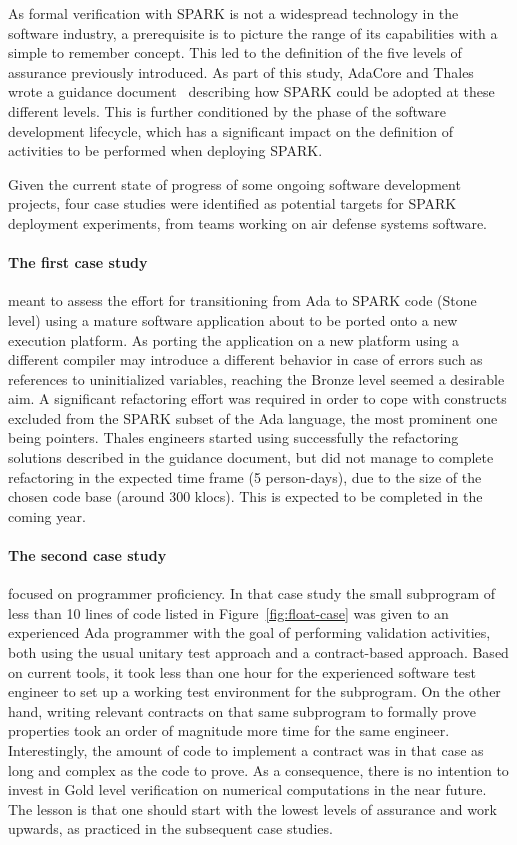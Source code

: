 \documentclass{eceasst}
\begin{document}
As formal verification with SPARK is not a widespread technology in the
software industry, a prerequisite is to picture the range of its capabilities
with a simple to remember concept. This led to the definition of the five
levels of assurance previously introduced. As part of this study, AdaCore and
Thales wrote a guidance document~\cite{AdaCoreThalesSPARK} describing how SPARK
could be adopted at these different levels. This is further conditioned by the
phase of the software development lifecycle, which has a significant impact on
the definition of activities to be performed when deploying SPARK.

Given the current state of progress of some ongoing software development
projects, four case studies were identified as potential targets for SPARK
deployment experiments, from teams working on air defense systems software.

\paragraph{The first case study} meant to assess the effort for transitioning from Ada to
SPARK code (Stone level) using a mature software application about to be ported
onto a new execution platform. As porting the application on a new platform
using a different compiler may introduce a different behavior in case of errors
such as references to uninitialized variables, reaching the Bronze level seemed
a desirable aim. A significant refactoring effort was required in order to cope
with constructs excluded from the SPARK subset of the Ada language, the most
prominent one being pointers. Thales engineers started using successfully the
refactoring solutions described in the guidance document, but did not manage to
complete refactoring in the expected time frame (5 person-days), due to the
size of the chosen code base (around 300 klocs). This is expected to be
completed in the coming year.

\paragraph{The second case study} focused on programmer proficiency. In that case study the small
subprogram of less than 10 lines of code listed in Figure~\ref{fig:float-case} was given to an experienced Ada
programmer with the goal of performing validation activities, both using the
usual unitary test approach and a contract-based approach. Based on current
tools, it took less than one hour for the experienced software test engineer to
set up a working test environment for the subprogram. On the other hand,
writing relevant contracts on that same subprogram to formally prove properties
took an order of magnitude more time for the same engineer. Interestingly, the
amount of code to implement a contract was in that case as long and complex as
the code to prove. As a consequence, there is no
intention to invest in Gold level verification on numerical computations in the
near future. The lesson is that one should start with the lowest levels of
assurance and work upwards, as practiced in the subsequent case studies.
\end{document}

